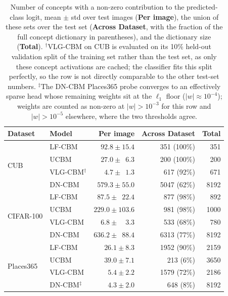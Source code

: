 \begin{table}[h]
  \centering
  \begin{tabular}{llrrr}
    \toprule
    \textbf{Dataset} & \textbf{Model} & \textbf{Per image} & \textbf{Across Dataset} & \textbf{Total} \\
    \midrule
    \multirow{4}{*}{CUB}
      & LF-CBM            & $92.8 \pm 15.4$  &  351 (100\%) &  351 \\
      & UCBM              & $27.0 \pm \phantom{0}6.3$   &  200 (100\%) &  200 \\
      & VLG-CBM$^\dagger$ & $\phantom{0}4.7 \pm \phantom{0}1.3$    &  617 \phantom{0}(92\%) &  671 \\
      & DN-CBM            & $579.3 \pm 55.0$ & 5047 \phantom{0}(62\%) & 8192 \\
    \midrule
    \multirow{4}{*}{CIFAR-100}
      & LF-CBM            & $87.5 \pm \phantom{0}22.4$  &  877 \phantom{0}(98\%) &  892 \\
      & UCBM              & $229.0 \pm 103.6$ &  981 \phantom{0}(98\%) & 1000 \\
      & VLG-CBM           & $\phantom{0}6.8 \pm \phantom{00}3.3$    &  533 \phantom{0}(68\%) &  780 \\
      & DN-CBM            & $636.2 \pm \phantom{0}88.4$ & 6313 \phantom{0}(77\%) & 8192 \\
    \midrule
    \multirow{4}{*}{Places365}
      & LF-CBM            & $26.1 \pm 8.3$  & 1952 \phantom{0}(90\%) & 2159 \\
      & UCBM              & $39.0 \pm 7.1$  &  213 \phantom{00}(6\%) & 3650 \\
      & VLG-CBM           & $\phantom{0}5.4 \pm 2.2$   & 1579 \phantom{0}(72\%) & 2186 \\
      & DN-CBM$^\ddagger$ & $\phantom{0}4.3 \pm 2.0$   &  648 \phantom{00}(8\%) & 8192 \\
    \bottomrule
  \end{tabular}
  \caption{Number of concepts with a non-zero contribution to the predicted-class logit, mean $\pm$ std over test images (\textbf{Per image}), the union of these sets over the test set (\textbf{Across Dataset}, with the fraction of the full concept dictionary in parentheses), and the dictionary size (\textbf{Total}). $^\dagger$VLG-CBM on CUB is evaluated on its 10\% held-out validation split of the training set rather than the test set, as only these concept activations are cached; the classifier fits this split perfectly, so the row is not directly comparable to the other test-set numbers. $^\ddagger$The DN-CBM Places365 probe converges to an effectively sparse head whose remaining weights sit at the $\ell_1$ floor ($|w|\approx10^{-4}$); weights are counted as non-zero at $|w|>10^{-3}$ for this row and $|w|>10^{-5}$ elsewhere, where the two thresholds agree.}
  \label{tab:local_vs_global}
\end{table}
